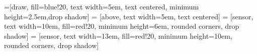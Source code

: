 \documentclass{article}
\begin{document}
    
    
    =[draw, fill=blue!20, text width=5em, 
        text centered, minimum height=2.5em,drop shadow]
     = [above, text width=5em, text centered]
     = [sensor, text width=10em, fill=red!20, 
        minimum height=6em, rounded corners, drop shadow]
     = [sensor, text width=13em, fill=red!20, 
        minimum height=10em, rounded corners, drop shadow]
    
    \def\blockdist{2.3}
    \def\edgedist{2.5}
    
\end{document}
